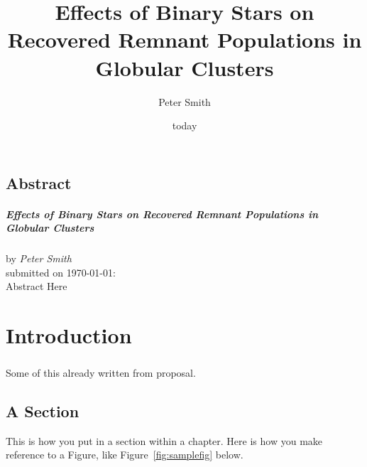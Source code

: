 \documentclass[12pt, oneside]{smuthesis}
\begin{document}
\frontmatter
\title{\sc Effects of Binary Stars on Recovered Remnant Populations in Globular Clusters}
\author{Peter Smith}
\date{today}
\medskip

\maketitle
\pagestyle{headings}

\begin{center}
\section*{\center \sc Abstract}
\paragraph*{\center \sc Effects of Binary Stars on Recovered Remnant Populations in Globular Clusters\\}
by {\em Peter Smith}\\
submitted on \today:\\

Abstract Here


\end{center}
\newpage

\tableofcontents
\listoffigures
\listoftables
\newpage
%
\mainmatter
\chapter{\sc Introduction}
\paragraph*{}

Some of this already written from proposal.


\citet{Abbate2018}

\section{\sc A Section}

This is how you put in a section within a chapter.
Here is how you make reference to a Figure, like Figure~\ref{fig:samplefig}
 below.
\end{document}
